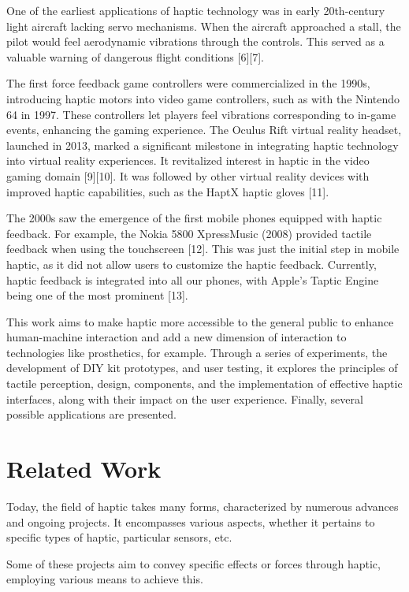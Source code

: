 One of the earliest applications of haptic technology was in early 20th-century light aircraft lacking servo mechanisms. When the aircraft approached a stall, the pilot would feel aerodynamic vibrations through the controls. This served as a valuable warning of dangerous flight conditions [6][7].

The first force feedback game controllers were commercialized in the 1990s, introducing haptic motors into video game controllers, such as with the Nintendo 64 in 1997. These controllers let players feel vibrations corresponding to in-game events, enhancing the gaming experience. The Oculus Rift virtual reality headset, launched in 2013, marked a significant milestone in integrating haptic technology into virtual reality experiences. It revitalized interest in haptic in the video gaming domain [9][10]. It was followed by other virtual reality devices with improved haptic capabilities, such as the HaptX haptic gloves [11].

The 2000s saw the emergence of the first mobile phones equipped with haptic feedback. For example, the Nokia 5800 XpressMusic (2008) provided tactile feedback when using the touchscreen [12]. This was just the initial step in mobile haptic, as it did not allow users to customize the haptic feedback. Currently, haptic feedback is integrated into all our phones, with Apple's Taptic Engine being one of the most prominent [13].

This work aims to make haptic more accessible to the general public to enhance human-machine interaction and add a new dimension of interaction to technologies like prosthetics, for example. Through a series of experiments, the development of DIY kit prototypes, and user testing, it explores the principles of tactile perception, design, components, and the implementation of effective haptic interfaces, along with their impact on the user experience. Finally, several possible applications are presented.

\section{Related Work}

Today, the field of haptic takes many forms, characterized by numerous advances and ongoing projects. It encompasses various aspects, whether it pertains to specific types of haptic, particular sensors, etc.

Some of these projects aim to convey specific effects or forces through haptic, employing various means to achieve this.

